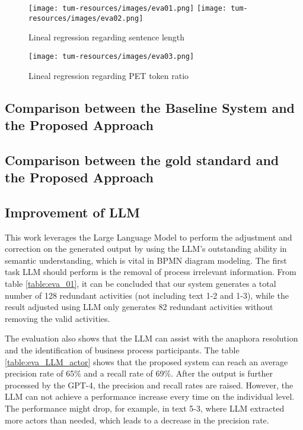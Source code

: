\begin{figure}[h]
    \centering
    \caption{Lineal regression regarding sentence length}
    \label{img:eva_li01}
    \texttt{[image: tum-resources/images/eva01.png]}
    \hspace{1in}
     \texttt{[image: tum-resources/images/eva02.png]}
\end{figure}

\begin{figure}[h]
    \centering
    \caption{Lineal regression regarding PET token ratio}
    \label{img:eva_li02}
    \texttt{[image: tum-resources/images/eva03.png]}
\end{figure}
\subsection{Comparison between the Baseline System and the Proposed Approach}
\subsection{Comparison between the gold standard and the Proposed Approach}
\subsection{Improvement of LLM}
This work leverages the Large Language Model to perform the adjustment and correction on the generated output by using the LLM's outstanding ability in semantic understanding, which is vital in BPMN diagram modeling. The first task LLM should perform is the removal of process irrelevant information. From table \ref{table:eva_01}, it can be concluded that our system generates a total number of 128 redundant activities (not including text 1-2 and 1-3), while the result adjusted using LLM only generates 82 redundant activities without removing the valid activities.

The evaluation also shows that the LLM can assist with the anaphora resolution and the identification of business process participants. The table \ref{table:eva_LLM_actor} shows that the proposed system can reach an average precision rate of 65\% and a recall rate of 69\%. After the output is further processed by the GPT-4, the precision and recall rates are raised. However, the LLM can not achieve a performance increase every time on the individual level. The performance might drop, for example, in text 5-3, where LLM extracted more actors than needed, which leads to a decrease in the precision rate. 

